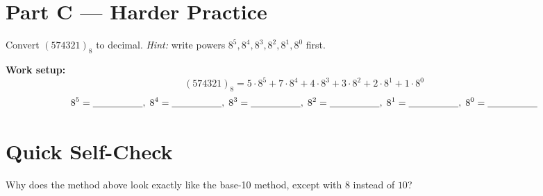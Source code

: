 \documentclass[12pt]{article}
\begin{document}
\vspace{1.5cm}

\section*{Part C — Harder Practice}
Convert $(574321)_8$ to decimal. \emph{Hint:} write powers
$8^5,8^4,8^3,8^2,8^1,8^0$ first.

\medskip
\textbf{Work setup:}
\[
(574321)_8 = 5\cdot 8^5 + 7\cdot 8^4 + 4\cdot 8^3 + 3\cdot 8^2 + 2\cdot 8^1 + 1\cdot 8^0
\]
\[
8^5=\underline{\hspace{1.8cm}},\;
8^4=\underline{\hspace{1.8cm}},\;
8^3=\underline{\hspace{1.8cm}},\;
8^2=\underline{\hspace{1.8cm}},\;
8^1=\underline{\hspace{1.8cm}},\;
8^0=\underline{\hspace{1.8cm}}
\]

\vspace{3cm}

\section*{Quick Self-Check}
Why does the method above look exactly like the base-10 method, except with $8$ instead of $10$?
\end{document}
